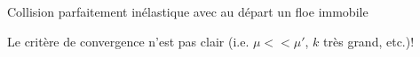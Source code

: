 \begin{frame}{Collision parfaitement inélastique avec au départ un floe immobile}
{{            %
            \vspace*{-0.3cm}
			\scriptsize
            \begin{tcolorbox}[colback=red!5,colframe=red!50!black,arc=0mm,boxrule=0.1mm,title=Remarque]
                \vspace*{-0.1cm}
                    Le critère de convergence n'est pas clair (i.e. $\mu << \mu'$, $k$ très grand, etc.)!
                \vspace*{-0.1cm}
            \end{tcolorbox}
            \normalsize

        }

    }
    
\end{frame}


